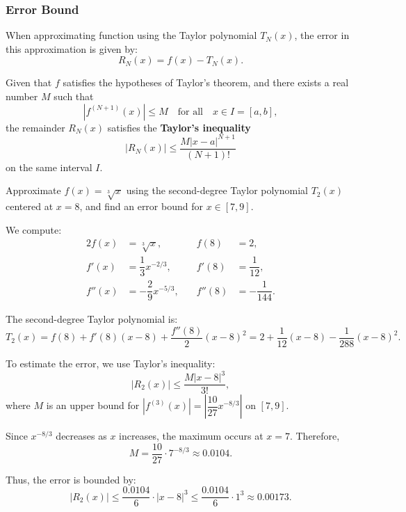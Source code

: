 \subsubsection{Error Bound}
When approximating function using the Taylor polynomial $T_N(x)$, the error in this approximation is given by:
\[R_N(x) = f(x) - T_N(x).\]
\begin{thm}
    Given that $f$ satisfies the hypotheses of Taylor's theorem, and there exists a real number $M$ such that
    \[|f^{(N+1)}(x)| \leq M \quad \text{for all} \quad x \in I = [a,b],\]
    the remainder \( R_N(x) \) satisfies the \textbf{Taylor's inequality} 
    \[|R_N(x)| \leq \frac{M |x - a|^{N+1}}{(N+1)!}\]
    on the same interval $I$.
\end{thm}  

\begin{ex}
Approximate $f(x) = \sqrt[3]{x}$ using the second-degree Taylor polynomial $T_2(x)$ centered at $x=8$, and find an error bound for $x \in [7,9]$.

We compute:
\begin{alignat*}{2}
f(x) &= \sqrt[3]{x}, &\quad f(8) &= 2, \\
f'(x) &= \dfrac{1}{3}x^{-2/3}, &\quad f'(8) &= \dfrac{1}{12}, \\
f''(x) &= -\dfrac{2}{9}x^{-5/3}, &\quad f''(8) &= -\dfrac{1}{144}.
\end{alignat*}

The second-degree Taylor polynomial is:
\[
T_2(x) = f(8) + f'(8)(x-8) + \dfrac{f''(8)}{2}(x-8)^2 = 2 + \dfrac{1}{12}(x - 8) - \dfrac{1}{288}(x - 8)^2.
\]

To estimate the error, we use Taylor's inequality:
\[
|R_2(x)| \leq \dfrac{M |x - 8|^3}{3!},
\]
where \( M \) is an upper bound for \( |f^{(3)}(x)| = \left| \dfrac{10}{27}x^{-8/3} \right| \) on \( [7,9] \).

Since \( x^{-8/3} \) decreases as \( x \) increases, the maximum occurs at \( x = 7 \). Therefore,
\[
M = \dfrac{10}{27} \cdot 7^{-8/3} \approx 0.0104.
\]

Thus, the error is bounded by:
\[
|R_2(x)| \leq \dfrac{0.0104}{6} \cdot |x - 8|^3 \leq \dfrac{0.0104}{6} \cdot 1^3 \approx 0.00173.
\]
\end{ex}


   
